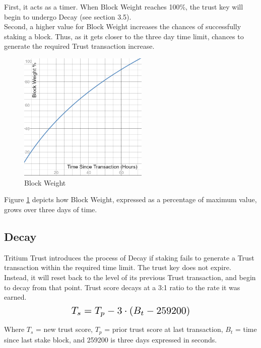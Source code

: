 \documentclass[11pt]{article}
\begin{document}
\noindent First, it acts as a timer. When Block Weight reaches 100\%, the trust key will begin to undergo Decay (see section 3.5).\\

\noindent Second, a higher value for Block Weight increases the chances of successfully staking a block. Thus, as it gets closer to the three day time limit, chances to generate the required Trust transaction increase.\\

\begin{figure}[h!]
    \centering
    \includegraphics[width=0.55\textwidth]{images/blockWeight.png}
    \caption{Block Weight \label{fig:blockWeight}}
\end{figure}

\noindent Figure \ref{fig:blockWeight} depicts how Block Weight, expressed as a percentage of maximum value, grows over three days of time.\\

\subsection{Decay}
Tritium Trust introduces the process of Decay if staking fails to generate a Trust transaction within the required time limit. The trust key does not expire. Instead, it will reset back to the level of its previous Trust transaction, and begin to decay from that point. Trust score decays at a 3:1 ratio to the rate it was earned.\\
\begin{equation}
\resizebox{.50\hsize}{!}{$T_s = T_p - 3 \cdot (B_t - 259200)$}
\end{equation}

\noindent Where $T_s$ = new trust score, $T_p$ = prior trust score at last transaction, $B_t$ = time since last stake block, and 259200 is three days expressed in seconds.\\
\end{document}
